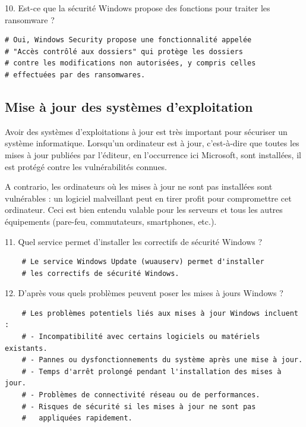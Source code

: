 10. Est-ce que la sécurité Windows propose des fonctions pour traiter les ransomware ?

\begin{verbatim}
# Oui, Windows Security propose une fonctionnalité appelée
# "Accès contrôlé aux dossiers" qui protège les dossiers
# contre les modifications non autorisées, y compris celles
# effectuées par des ransomwares.
\end{verbatim}

\subsection*{Mise à jour des systèmes d'exploitation}
{}

\noindent Avoir des systèmes d'exploitations à jour est très important pour sécuriser un système informatique. Lorsqu’un ordinateur est à jour, c’est-à-dire que toutes les mises à jour publiées par l’éditeur, en l’occurrence ici Microsoft, sont installées, il est protégé contre les vulnérabilités connues. 

\noindent A contrario, les ordinateurs où les mises à jour ne sont pas installées sont vulnérables : un logiciel malveillant peut en tirer profit pour compromettre cet ordinateur. Ceci est bien entendu valable pour les serveurs et tous les autres équipements (pare-feu, commutateurs, smartphones, etc.).

\vspace{0.5cm}

11. Quel service permet d’installer les correctifs de sécurité Windows ?

\begin{center}
  \begin{verbatim}
    # Le service Windows Update (wuauserv) permet d'installer
    # les correctifs de sécurité Windows.
  \end{verbatim}
\end{center}

\vspace{0.5cm}

12. D’après vous quels problèmes peuvent poser les mises à jours Windows ?

\begin{center}
  \begin{verbatim}
    # Les problèmes potentiels liés aux mises à jour Windows incluent :
    # - Incompatibilité avec certains logiciels ou matériels existants.
    # - Pannes ou dysfonctionnements du système après une mise à jour.
    # - Temps d'arrêt prolongé pendant l'installation des mises à jour.
    # - Problèmes de connectivité réseau ou de performances.
    # - Risques de sécurité si les mises à jour ne sont pas
    #   appliquées rapidement.
  \end{verbatim}
\end{center}

